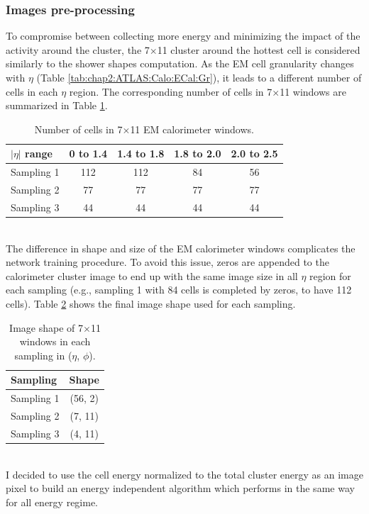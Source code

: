 \subsubsection{Images pre-processing}
\label{gamma:CNN:PreProcessing}
To compromise between collecting more energy and minimizing the impact of the activity around the cluster, the 7$\times$11 cluster around the hottest cell is considered similarly to the shower shapes computation. As the EM cell granularity changes with $\eta$ (Table \ref{tab:chap2:ATLAS:Calo:ECal:Gr}), it leads to a different number of cells in each $\eta$ region. The corresponding number of cells in 7$\times$11 windows are summarized in Table \ref{tab:gamma:CNN:PreProcessing:NCells}.
\begin{table}[htbp]
    \centering
    \begin{tabular}{lcccc}
    \hline\hline
        $|\eta|$ range & 0 to 1.4 & 1.4 to 1.8 & 1.8 to 2.0 & 2.0 to 2.5 \\
    \hline
        Sampling 1 & 112 & 112 & 84 & 56 \\
        Sampling 2 & 77 & 77 & 77 & 77 \\
        Sampling 3 & 44 & 44 & 44 & 44 \\
    \hline\hline
    \end{tabular}
    \caption{Number of cells in 7$\times$11 EM calorimeter windows.}
    \label{tab:gamma:CNN:PreProcessing:NCells}
\end{table}
\\
The difference in shape and size of the EM calorimeter windows complicates the network training procedure. To avoid this issue, zeros are appended to the calorimeter cluster image to end up with the same image size in all $\eta$ region for each sampling (e.g., sampling 1 with 84 cells is completed by zeros, to have 112 cells). Table \ref{tab:gamma:CNN:PreProcessing:ImgSize} shows the final image shape used for each sampling.
\begin{table}[htbp]
    \centering
    \begin{tabular}{lc}
    \hline\hline
        Sampling & Shape \\
    \hline
        Sampling 1 & (56, 2)\\
        Sampling 2 & (7, 11)  \\
        Sampling 3 & (4, 11) \\
    \hline\hline
    \end{tabular}
    \caption{Image shape of 7$\times$11 windows in each sampling in ($\eta$, $\phi$).}
    \label{tab:gamma:CNN:PreProcessing:ImgSize}
\end{table}
\\
I decided to use the cell energy normalized to the total cluster energy as an image pixel to build an energy independent algorithm which performs in the same way for all energy regime.

